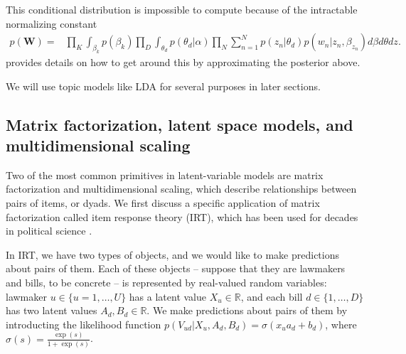 This conditional distribution is impossible to compute because of the
intractable normalizing constant
\begin{align} 
  p(\bm W) = & \prod_K \int_{\beta_k} p(\beta_k)
  \prod_D \int_{\theta_d} p(\theta_d | \alpha) \prod_N \sum_{n=1}^N p(z_n | \theta_d) p(w_n | z_n, \beta_{z_n}) d\beta d\theta dz.
\end{align}
 provides details on how to get around
this by approximating the posterior above.

We will use topic models like LDA for several purposes in later
sections.



\subsection{Matrix factorization, latent space models, and
  multidimensional scaling}

Two of the most common primitives in latent-variable models are matrix
factorization \citep{salakhutdinov:2008a} and multidimensional scaling,
which describe relationships between pairs of items, or dyads. We
first discuss a specific application of matrix factorization called
item response theory (IRT), which has been used for decades in
political science
\citep{clinton:2004,martin:2002,poole:1991,enelow:1984,albert:1992}.

In IRT, we have two types of objects, and we would like to make
predictions about pairs of them.  Each of these objects -- suppose
that they are lawmakers and bills, to be concrete -- is represented by
real-valued random variables: lawmaker $u \in \{ u=1, \ldots, U \}$
has a latent value $X_u \in \mathbb{R}$, and each bill $d \in \{ 1,
\ldots, D \}$ has two latent values $A_d,B_d \in \mathbb{R}$.  We make
predictions about pairs of them by introducting the likelihood
function $p(V_{ud} | X_u, A_d, B_d) = \sigma( x_u a_d + b_d )$, where
$\sigma(s) = \frac{\exp(s)}{ 1 + \exp(s) }$.

